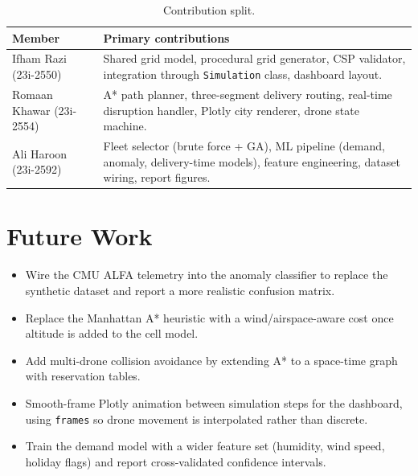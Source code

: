 \documentclass[11pt,a4paper]{article}
\begin{document}
\begin{table}[H]
\centering
\caption{Contribution split.}
\begin{tabular}{@{}p{4cm}p{10cm}@{}}
\toprule
\textbf{Member}        & \textbf{Primary contributions} \\
\midrule
Ifham Razi (23i-2550)  & Shared grid model, procedural grid generator,
                         CSP validator, integration through
                         \texttt{Simulation} class, dashboard layout. \\
\addlinespace
Romaan Khawar (23i-2554) & A* path planner, three-segment delivery
                          routing, real-time disruption handler,
                          Plotly city renderer, drone state machine. \\
\addlinespace
Ali Haroon (23i-2592)   & Fleet selector (brute force + GA), ML pipeline
                         (demand, anomaly, delivery-time models), feature
                         engineering, dataset wiring, report figures. \\
\bottomrule
\end{tabular}
\end{table}

\section{Future Work}
\label{sec:future}

\begin{itemize}[leftmargin=*]
  \item Wire the CMU ALFA telemetry into the anomaly classifier to
        replace the synthetic dataset and report a more realistic
        confusion matrix.
  \item Replace the Manhattan A* heuristic with a wind/airspace-aware
        cost once altitude is added to the cell model.
  \item Add multi-drone collision avoidance by extending A* to a
        space-time graph with reservation tables.
  \item Smooth-frame Plotly animation between simulation steps for the
        dashboard, using \texttt{frames} so drone movement is
        interpolated rather than discrete.
  \item Train the demand model with a wider feature set
        (humidity, wind speed, holiday flags) and report cross-validated
        confidence intervals.
\end{itemize}
\end{document}
